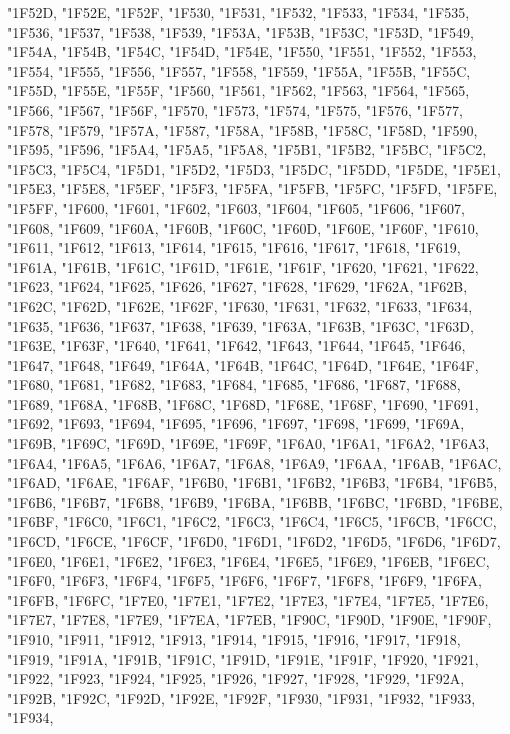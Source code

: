 {"1F52D,
"1F52E,
"1F52F,
"1F530,
"1F531,
"1F532,
"1F533,
"1F534,
"1F535,
"1F536,
"1F537,
"1F538,
"1F539,
"1F53A,
"1F53B,
"1F53C,
"1F53D,
"1F549,
"1F54A,
"1F54B,
"1F54C,
"1F54D,
"1F54E,
"1F550,
"1F551,
"1F552,
"1F553,
"1F554,
"1F555,
"1F556,
"1F557,
"1F558,
"1F559,
"1F55A,
"1F55B,
"1F55C,
"1F55D,
"1F55E,
"1F55F,
"1F560,
"1F561,
"1F562,
"1F563,
"1F564,
"1F565,
"1F566,
"1F567,
"1F56F,
"1F570,
"1F573,
"1F574,
"1F575,
"1F576,
"1F577,
"1F578,
"1F579,
"1F57A,
"1F587,
"1F58A,
"1F58B,
"1F58C,
"1F58D,
"1F590,
"1F595,
"1F596,
"1F5A4,
"1F5A5,
"1F5A8,
"1F5B1,
"1F5B2,
"1F5BC,
"1F5C2,
"1F5C3,
"1F5C4,
"1F5D1,
"1F5D2,
"1F5D3,
"1F5DC,
"1F5DD,
"1F5DE,
"1F5E1,
"1F5E3,
"1F5E8,
"1F5EF,
"1F5F3,
"1F5FA,
"1F5FB,
"1F5FC,
"1F5FD,
"1F5FE,
"1F5FF,
"1F600,
"1F601,
"1F602,
"1F603,
"1F604,
"1F605,
"1F606,
"1F607,
"1F608,
"1F609,
"1F60A,
"1F60B,
"1F60C,
"1F60D,
"1F60E,
"1F60F,
"1F610,
"1F611,
"1F612,
"1F613,
"1F614,
"1F615,
"1F616,
"1F617,
"1F618,
"1F619,
"1F61A,
"1F61B,
"1F61C,
"1F61D,
"1F61E,
"1F61F,
"1F620,
"1F621,
"1F622,
"1F623,
"1F624,
"1F625,
"1F626,
"1F627,
"1F628,
"1F629,
"1F62A,
"1F62B,
"1F62C,
"1F62D,
"1F62E,
"1F62F,
"1F630,
"1F631,
"1F632,
"1F633,
"1F634,
"1F635,
"1F636,
"1F637,
"1F638,
"1F639,
"1F63A,
"1F63B,
"1F63C,
"1F63D,
"1F63E,
"1F63F,
"1F640,
"1F641,
"1F642,
"1F643,
"1F644,
"1F645,
"1F646,
"1F647,
"1F648,
"1F649,
"1F64A,
"1F64B,
"1F64C,
"1F64D,
"1F64E,
"1F64F,
"1F680,
"1F681,
"1F682,
"1F683,
"1F684,
"1F685,
"1F686,
"1F687,
"1F688,
"1F689,
"1F68A,
"1F68B,
"1F68C,
"1F68D,
"1F68E,
"1F68F,
"1F690,
"1F691,
"1F692,
"1F693,
"1F694,
"1F695,
"1F696,
"1F697,
"1F698,
"1F699,
"1F69A,
"1F69B,
"1F69C,
"1F69D,
"1F69E,
"1F69F,
"1F6A0,
"1F6A1,
"1F6A2,
"1F6A3,
"1F6A4,
"1F6A5,
"1F6A6,
"1F6A7,
"1F6A8,
"1F6A9,
"1F6AA,
"1F6AB,
"1F6AC,
"1F6AD,
"1F6AE,
"1F6AF,
"1F6B0,
"1F6B1,
"1F6B2,
"1F6B3,
"1F6B4,
"1F6B5,
"1F6B6,
"1F6B7,
"1F6B8,
"1F6B9,
"1F6BA,
"1F6BB,
"1F6BC,
"1F6BD,
"1F6BE,
"1F6BF,
"1F6C0,
"1F6C1,
"1F6C2,
"1F6C3,
"1F6C4,
"1F6C5,
"1F6CB,
"1F6CC,
"1F6CD,
"1F6CE,
"1F6CF,
"1F6D0,
"1F6D1,
"1F6D2,
"1F6D5,
"1F6D6,
"1F6D7,
"1F6E0,
"1F6E1,
"1F6E2,
"1F6E3,
"1F6E4,
"1F6E5,
"1F6E9,
"1F6EB,
"1F6EC,
"1F6F0,
"1F6F3,
"1F6F4,
"1F6F5,
"1F6F6,
"1F6F7,
"1F6F8,
"1F6F9,
"1F6FA,
"1F6FB,
"1F6FC,
"1F7E0,
"1F7E1,
"1F7E2,
"1F7E3,
"1F7E4,
"1F7E5,
"1F7E6,
"1F7E7,
"1F7E8,
"1F7E9,
"1F7EA,
"1F7EB,
"1F90C,
"1F90D,
"1F90E,
"1F90F,
"1F910,
"1F911,
"1F912,
"1F913,
"1F914,
"1F915,
"1F916,
"1F917,
"1F918,
"1F919,
"1F91A,
"1F91B,
"1F91C,
"1F91D,
"1F91E,
"1F91F,
"1F920,
"1F921,
"1F922,
"1F923,
"1F924,
"1F925,
"1F926,
"1F927,
"1F928,
"1F929,
"1F92A,
"1F92B,
"1F92C,
"1F92D,
"1F92E,
"1F92F,
"1F930,
"1F931,
"1F932,
"1F933,
"1F934,
}
